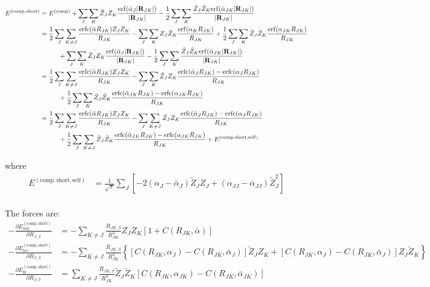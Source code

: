 \documentclass[paper=a4, fontsize=11pt]{article} %
\numberwithin{equation}{section} %
\numberwithin{figure}{section} %
\numberwithin{table}{section} %
\newcommand{\p}{\partial}
\newcommand{\bR}{{\bf{R}}}
\newcommand{\rNN}{{\mathrm{NN}}}
\newcommand{\rself}{{\mathrm{self}}}
\newcommand{\rshort}{{\mathrm{short}}}
\newcommand{\rerf}{{\mathrm{erf}}}
\newcommand{\rerfc}{{\mathrm{erfc}}}
\newcommand{\rH}{{\mathrm{H}}}
\newcommand{\rcomp}{{\mathrm{comp}}}
\newcommand{\rlo}{{\mathrm{loc}}}
\newcommand{\al}{{\alpha}}
\newcommand{\RJb}{{R_{J,\beta}}}
\newcommand{\bal}{{\bar{\alpha}}}
\begin{document}
\begin{equation}
\begin{split}
E^{(\rcomp,\rshort)} 
&= E^{(\rcomp)} + \sum_J\sum_K \tilde Z_J Z_K\frac{\rerf(\bal_J |\bR_{JK}|)}{|\bR_{JK}|} - \frac{1}{2}\sum_J\sum_K\frac{\tilde Z_J \tilde Z_K\rerf(\bal_{JK} |\bR_{JK}|)}{|\bR_{JK}|}\\
&= \frac{1}{2}\sum_{J} \sum_{K \neq J} \frac{\rerfc(\bal R_{JK})Z_JZ_{K}}{R_{JK}}  - \sum_J\sum_K Z_J \tilde Z_K \frac{\rerf(\al_{K}R_{JK})}{R_{JK}} + \frac{1}{2}\sum_J\sum_K \tilde Z_J\tilde Z_K \frac{\rerf(\al_{JK}R_{JK})}{R_{JK}} \\
&\hspace{10mm}  + \sum_J\sum_K \tilde Z_J Z_K\frac{\rerf(\bal_J |\bR_{JK}|)}{|\bR_{JK}|} - \frac{1}{2}\sum_J\sum_K\frac{\tilde Z_J \tilde Z_K\rerf(\bal_{JK} |\bR_{JK}|)}{|\bR_{JK}|}\\
&= \frac{1}{2}\sum_{J} \sum_{K \neq J} \frac{\rerfc(\bal R_{JK})Z_JZ_{K}}{R_{JK}}  - \sum_J \sum_K \tilde Z_J Z_K \frac{\rerfc(\bal_J R_{JK}) - \rerfc(\al_J R_{JK})}{R_{JK}}  \\
&\hspace{10mm}+ \frac{1}{2}\sum_J\sum_K \tilde Z_J \tilde Z_K  \frac{\rerfc(\bal_{JK} R_{JK}) - \rerfc(\al_{JK} R_{JK})}{R_{JK}}\\
&= \frac{1}{2}\sum_{J} \sum_{K \neq J} \frac{\rerfc(\bal R_{JK})Z_JZ_{K}}{R_{JK}}  - \sum_J \sum_{K \neq J} \tilde Z_J Z_K \frac{\rerfc(\bal_J R_{JK}) - \rerfc(\al_J R_{JK})}{R_{JK}}  \\
&\hspace{10mm}+ \frac{1}{2}\sum_J\sum_{K \neq J} \tilde Z_J \tilde Z_K  \frac{\rerfc(\bal_{JK} R_{JK}) - \rerfc(\al_{JK} R_{JK})}{R_{JK}} + E^{(\rcomp,\rshort,\rself)} \\
\end{split}
\end{equation}

where
\begin{equation}
\begin{split}
E^{(\rcomp,\rshort,\rself)} 
&= \frac{1}{\sqrt{\pi}}\sum_J \left[-2(\al_J - \bal_J)\tilde Z_J Z_J + (\al_{JJ}-\bal_{JJ})\tilde Z_J ^2\right] \\
\end{split}
\end{equation}

The forces are:
\begin{equation}
\begin{split}
-\frac{\p E_{\rNN}^{(\rcomp,\rshort)}}{\p \RJb} &=-\sum_{K \neq J}\frac{R_{JK,\beta}}{R_{JK}^3} Z_J  Z_K \left[ 1 + C(R_{JK},\bal)\right]\\
-\frac{\p E_{\rlo}^{(\rcomp,\rshort)}}{\p \RJb} 
&= -\sum_{K \neq J}\frac{R_{JK,\beta}}{R_{JK}^3} \left\{\left[C (R_{JK},\al_J)-C (R_{JK},\bal_J)\right]\tilde Z_J Z_K  + \left[C(R_{JK},\al_J)-C (R_{JK},\bal_J)\right] Z_J \tilde Z_K\right\}\\
-\frac{\p E_{\rH}^{(\rcomp,\rshort)}}{\p \RJb} 
&= \sum_{K \neq J}\frac{R_{JK,\beta}}{R_{JK}^3}\tilde Z_J \tilde Z_K \left[C (R_{JK},\al_{JK})  - C (R_{JK},\bal_{JK})\right]\\ 
\end{split}
\end{equation}
\end{document}
